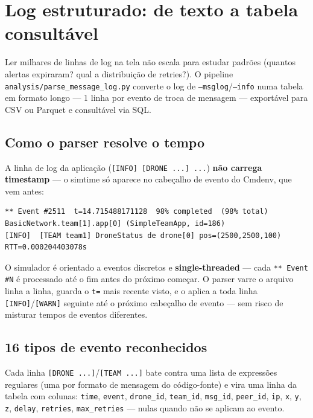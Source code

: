 \documentclass[11pt,a4paper]{article}
\begin{document}
\newpage
\section{Log estruturado: de texto a tabela consultável}

Ler milhares de linhas de log na tela não escala para estudar padrões (quantos
alertas expiraram? qual a distribuição de retries?). O pipeline
\texttt{analysis/parse\_message\_log.py} converte o log de
\texttt{--msglog}/\texttt{--info} numa tabela em formato longo --- 1 linha
por evento de troca de mensagem --- exportável para CSV ou Parquet e
consultável via SQL.

\subsection{Como o parser resolve o tempo}

A linha de log da aplicação (\texttt{[INFO]\ [DRONE ...] ...}) \textbf{não
carrega timestamp} --- o simtime só aparece no cabeçalho de evento do
Cmdenv, que vem antes:

\begin{lstlisting}[style=simlog]
** Event #2511  t=14.715488171128  98% completed  (98% total)   BasicNetwork.team[1].app[0] (SimpleTeamApp, id=186)
[INFO]	[TEAM team1] DroneStatus de drone[0] pos=(2500,2500,100) RTT=0.000204403078s
\end{lstlisting}

\begin{explica}
O simulador é orientado a eventos discretos e \textbf{single-threaded} ---
cada \texttt{** Event \#N} é processado até o fim antes do próximo começar.
O parser varre o arquivo linha a linha, guarda o \texttt{t=} mais recente
visto, e o aplica a toda linha \texttt{[INFO]}/\texttt{[WARN]} seguinte até
o próximo cabeçalho de evento --- sem risco de misturar tempos de eventos
diferentes.
\end{explica}

\subsection{16 tipos de evento reconhecidos}

Cada linha \texttt{[DRONE ...]}/\texttt{[TEAM ...]} bate contra uma lista de
expressões regulares (uma por formato de mensagem do código-fonte) e vira uma
linha da tabela com colunas: \texttt{time}, \texttt{event}, \texttt{drone\_id},
\texttt{team\_id}, \texttt{msg\_id}, \texttt{peer\_id}, \texttt{ip},
\texttt{x}, \texttt{y}, \texttt{z}, \texttt{delay}, \texttt{retries},
\texttt{max\_retries} --- nulas quando não se aplicam ao evento.
\end{document}
